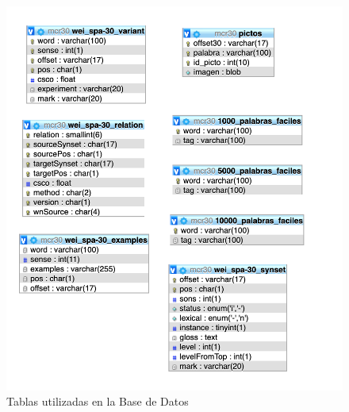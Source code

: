 \begin{figure}[!h]
	\includegraphics[width=.8\textwidth]{Imagenes/Bitmap/Capitulo4/tablasBBDD.png}
	\centering
	\caption{Tablas utilizadas en la Base de Datos}
	\label{fig:tablasBBDD}
\end{figure}

